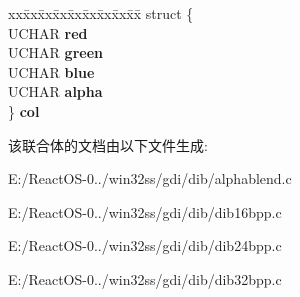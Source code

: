 \begin{DoxyCompactItemize}
\begin{tabbing}
\end{tabbing}\item 
\mbox{\label{union_n_i_c_e_p_i_x_e_l32_a585037ff6c7249dd50025960d1c69949}} 
\begin{tabbing}
xx\=xx\=xx\=xx\=xx\=xx\=xx\=xx\=xx\=\kill
struct \{\\
\>UCHAR {\bfseries red}\\
\>UCHAR {\bfseries green}\\
\>UCHAR {\bfseries blue}\\
\>UCHAR {\bfseries alpha}\\
\} {\bfseries col}\\

\end{tabbing}\end{DoxyCompactItemize}


该联合体的文档由以下文件生成\+:\begin{DoxyCompactItemize}
\item 
E\+:/\+React\+O\+S-\/0../win32ss/gdi/dib/alphablend.\+c\item 
E\+:/\+React\+O\+S-\/0../win32ss/gdi/dib/dib16bpp.\+c\item 
E\+:/\+React\+O\+S-\/0../win32ss/gdi/dib/dib24bpp.\+c\item 
E\+:/\+React\+O\+S-\/0../win32ss/gdi/dib/dib32bpp.\+c\end{DoxyCompactItemize}
